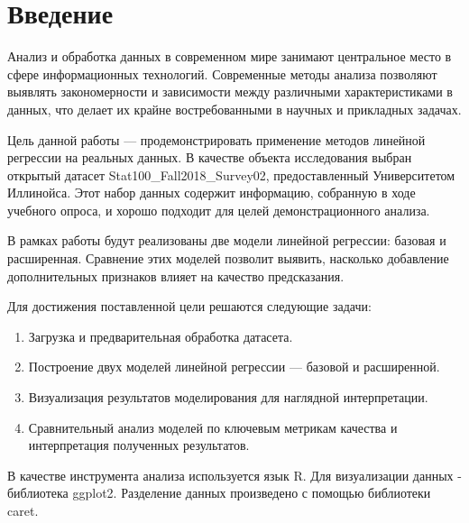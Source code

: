 \chapter{Введение}
Анализ и обработка данных в современном мире занимают центральное место в сфере информационных технологий. Современные методы анализа позволяют выявлять закономерности и зависимости между различными характеристиками в данных, что делает их крайне востребованными в научных и прикладных задачах.

Цель данной работы — продемонстрировать применение методов линейной регрессии на реальных данных. В качестве объекта исследования выбран открытый датасет Stat100\_Fall2018\_Survey02, предоставленный Университетом Иллинойса. Этот набор данных содержит информацию, собранную в ходе учебного опроса, и хорошо подходит для целей демонстрационного анализа.

В рамках работы будут реализованы две модели линейной регрессии: базовая и расширенная. Сравнение этих моделей позволит выявить, насколько добавление дополнительных признаков влияет на качество предсказания.

Для достижения поставленной цели решаются следующие задачи:

\begin{enumerate}
	\item Загрузка и предварительная обработка датасета.
	\item Построение двух моделей линейной регрессии — базовой и расширенной.
	\item Визуализация результатов моделирования для наглядной интерпретации.
	\item Сравнительный анализ моделей по ключевым метрикам качества и интерпретация полученных результатов.
\end{enumerate}

В качестве инструмента анализа используется язык R\cite{metloff2019}. Для визуализации данных - библиотека ggplot2\cite{mastitsky2017}. Разделение данных произведено с помощью библиотеки caret\cite{caret2019}.